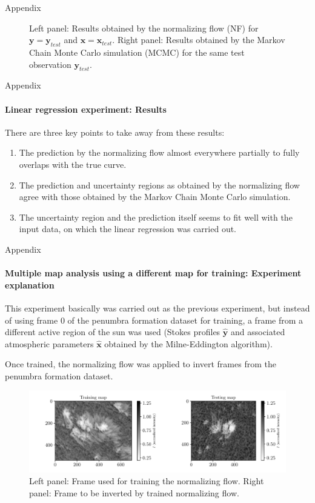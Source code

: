 \documentclass{beamer}
\newcommand\matr[1]{\ensuremath{\boldsymbol{\mathbf{#1}}}}
\newcommand\vect[1]{\ensuremath{\bm{#1}}}
\begin{document}
\begin{frame}[allowframebreaks]{Appendix}
\begin{figure}[h!]
\begin{subfigure}[t]{0.49\textwidth}
		\end{subfigure}
		\caption{Left panel: Results obtained by the normalizing flow (NF) for $\vect{y} = \vect{y}_{test}$ and $\vect{x} = \vect{x}_{test}$. Right panel: Results obtained by the Markov Chain Monte Carlo simulation (MCMC) for the same test observation $\vect{y}_{test}$.}
		\label{fig:nf-linear-regression-example-performance}
	\end{figure}
\end{frame}

\begin{frame}[allowframebreaks]{Appendix}
	\framesubtitle{Linear regression experiment: Results}
	There are three key points to take away from these results:
	\begin{enumerate}
		\item The prediction by the normalizing flow almost everywhere partially to fully overlaps with the true curve.
		\item The prediction and uncertainty regions as obtained by the normalizing flow agree with those obtained by the Markov Chain Monte Carlo simulation.
		\item The uncertainty region and the prediction itself seems to fit well with the input data, on which the linear regression was carried out.
	\end{enumerate}
\end{frame}

\begin{frame}[allowframebreaks]{Appendix}
	\framesubtitle{Multiple map analysis using a different map for training: Experiment explanation} %
	This experiment basically was carried out as the previous experiment, but instead of using frame 0 of the penumbra formation dataset for training, a frame from a different active region of the sun was used (Stokes profiles $\hat{\matr{y}}$ and associated atmospheric parameters $\hat{\matr{x}}$ obtained by the Milne-Eddington algorithm).
	
	Once trained, the normalizing flow was applied to invert frames from the penumbra formation dataset.
	\begin{figure}[h!]
		\centering
		\includegraphics[width=\textwidth]{figures/thesis/nf-milne-eddington-example-4-trainingmap-testingmap-nflows-piecewisequadratic.pdf}
		\caption{Left panel: Frame used for training the normalizing flow. Right panel: Frame to be inverted by trained normalizing flow.}
		\label{fig:nf-milne-eddington-example-4-trainingmap-testingmap-nflows-piecewisequadratic}
	\end{figure}
\end{frame}
\end{document}
